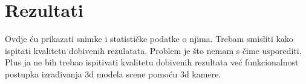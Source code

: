 \newpage
\setcounter{figure}{0}

\section{Rezultati} %
\label{sec:Rezultati}

Ovdje ću prikazati snimke i statističke podatke o njima.
Trebam smisliti kako ispitati kvalitetu dobivenih rezulatata. 
Problem je što nemam s čime usporediti.
Plus ja ne bih trebao ispitivati kvalitetu dobivenih rezultata već
funkcionalnost postupka izrađivanja 3d modela scene pomoću 3d kamere.


